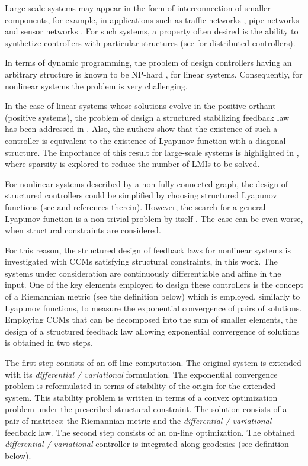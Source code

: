 \documentclass[10pt,twocolumn,twoside]{IEEEtran}
\theoremstyle{plain}
\theoremstyle{definition}
\theoremstyle{remark}
\begin{document}
Large-scale systems may appear in the form of interconnection of smaller components, for example, in applications such as traffic networks \cite{CanudasdeWitMorbidiLeonOjedaEtAl2015}, pipe networks \cite{Persis2011a} and sensor networks \cite{Pajic2011}. For such systems, a property often desired is the ability to synthetize controllers with particular structures (see \cite{Siljak1991,Bai2011} for distributed controllers). 

In terms of dynamic programming, the problem of design controllers having an arbitrary structure is known to be NP-hard \cite{BlondelTsitsiklis1997,Tanaka2011}, for linear systems. Consequently, for nonlinear systems the problem is very challenging.

In the case of linear systems whose solutions evolve in the positive orthant (positive systems), the problem of design a structured stabilizing feedback law has been addressed in \cite{Tanaka2011}. Also, the authors show that the existence of such a controller is equivalent to the existence of Lyapunov function with a diagonal structure. The importance of this result for large-scale systems is highlighted in \cite{Rantzer2015}, where sparsity is explored to reduce the number of LMIs to be solved.

For nonlinear systems described by a non-fully connected graph, the design of structured controllers could be simplified by choosing structured Lyapunov functions (see \cite{Dirr2015} and references therein). However, the search for a general Lyapunov function is a non-trivial problem by itself \cite{MalisoffMazenc2009}. The case can be even worse, when structural constraints are considered.

For this reason, the structured design of feedback laws for nonlinear systems is investigated with CCMs satisfying structural constraints, in this work. The systems under consideration are continuously differentiable and affine in the input. One of the key elements employed to design these controllers is the concept of a Riemannian metric (see the definition below) which is employed, similarly to Lyapunov functions, to measure the exponential convergence of pairs of solutions. Employing CCMs that can be decomposed into the sum of smaller elements, the design of a structured feedback law allowing exponential convergence of solutions is obtained in two steps. 

The first step consists of an off-line computation. The original system is extended with its \emph{differential / variational} formulation. The exponential convergence problem is reformulated in terms of stability of the origin for the extended system. This stability problem is written in terms of a convex optimization problem under the prescribed structural constraint. The solution consists of a pair of matrices: the Riemannian metric and the \emph{differential / variational} feedback law. The second step consists of an on-line optimization. The obtained \emph{differential / variational} controller is integrated along geodesics (see definition below).
\end{document}

